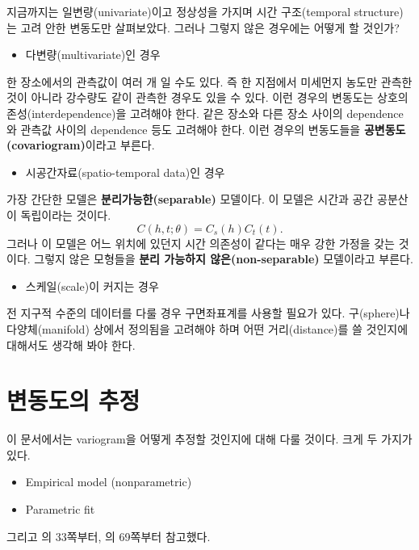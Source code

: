 \documentclass[b5paper,]{scrbook}
\providecommand{\tightlist}{%
  \setlength{\itemsep}{0pt}\setlength{\parskip}{0pt}}
\theoremstyle{plain}
\theoremstyle{definition}
\numberwithin{equation}{section}
\begin{document}
지금까지는 일변량(univariate)이고 정상성을 가지며 시간 구조(temporal
structure)는 고려 안한 변동도만 살펴보았다. 그러나 그렇지 않은 경우에는
어떻게 할 것인가?

\begin{itemize}
\tightlist
\item
  다변량(multivariate)인 경우
\end{itemize}

한 장소에서의 관측값이 여러 개 일 수도 있다. 즉 한 지점에서 미세먼지
농도만 관측한 것이 아니라 강수량도 같이 관측한 경우도 있을 수 있다. 이런
경우의 변동도는 상호의존성(interdependence)을 고려해야 한다. 같은 장소와
다른 장소 사이의 dependence와 관측값 사이의 dependence 등도 고려해야
한다. 이런 경우의 변동도들을 \textbf{공변동도(covariogram)}이라고
부른다.

\begin{itemize}
\tightlist
\item
  시공간자료(spatio-temporal data)인 경우
\end{itemize}

가장 간단한 모델은 \textbf{분리가능한(separable)} 모델이다. 이 모델은
시간과 공간 공분산이 독립이라는 것이다.
\[C(h,t;\theta)=C_{s}(h)C_{t}(t).\] 그러나 이 모델은 어느 위치에 있던지
시간 의존성이 같다는 매우 강한 가정을 갖는 것이다. 그렇지 않은 모형들을
\textbf{분리 가능하지 않은(non-separable)} 모델이라고 부른다.

\begin{itemize}
\tightlist
\item
  스케일(scale)이 커지는 경우
\end{itemize}

전 지구적 수준의 데이터를 다룰 경우 구면좌표계를 사용할 필요가 있다.
구(sphere)나 다양체(manifold) 상에서 정의됨을 고려해야 하며 어떤
거리(distance)를 쓸 것인지에 대해서도 생각해 봐야 한다.

\chapter{변동도의 추정}\label{variogramest}

이 문서에서는 variogram을 어떻게 추정할 것인지에 대해 다룰 것이다. 크게
두 가지가 있다.

\begin{itemize}
\item
  Empirical model (nonparametric)
\item
  Parametric fit
\end{itemize}

그리고 \citep{Gelfand2010}의 33쪽부터, \citep{Cressie1993}의 69쪽부터
참고했다.
\end{document}
